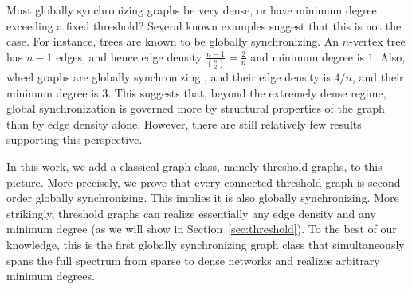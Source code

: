 \documentclass[11pt,reqno]{amsart}
\theoremstyle{definition}
\begin{document}
Must globally synchronizing graphs be very dense, or have minimum degree exceeding a fixed threshold? Several known examples suggest that this is not the case.
For instance, trees are known to be globally synchronizing. An $n$-vertex tree has $n-1$ edges, and hence edge density $\frac{n-1}{\binom{n}{2}}=\frac{2}{n}$ and minimum degree is $1$.
Also, wheel graphs are globally synchronizing \cite{canale2010wheels}, and their edge density is \(4/n\), and their minimum degree is \(3\).
This suggests that, beyond the extremely dense regime, global synchronization is governed more by structural properties of the graph than by edge density alone.
However, there are still relatively few results supporting this perspective.
\begin{center}
\vspace{-0.4em}

\vspace{-0.6em}
\label{fig:density}
\vspace{-0.8em}
\end{center}
In this work, we add a classical graph class, namely threshold graphs, to this picture.
More precisely, we prove that every connected threshold graph is second-order globally synchronizing. This implies it is also globally synchronizing.
More strikingly, threshold graphs can realize essentially any edge density and any minimum degree (as we will show in Section~\ref{sec:threshold}).
To the best of our knowledge, this is the first globally synchronizing graph class that simultaneously spans the full spectrum from sparse to dense networks and realizes arbitrary minimum degrees.
\end{document}
